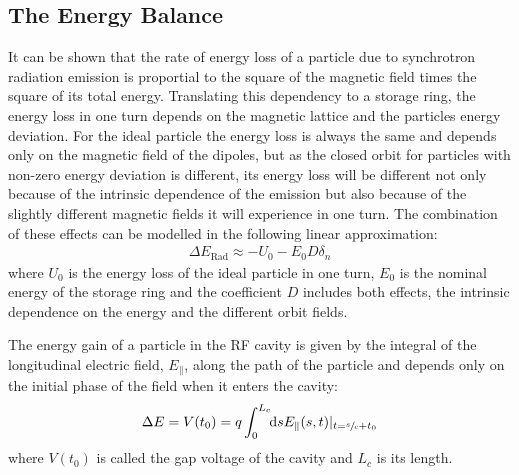 \documentclass[
	12pt,				%
	openright,			%
	oneside,			%
	a4paper,		%
	chapter=TITLE,		%
	section=TITLE,		%
    brazil,				%
	english,			%
	sumario=tradicional,
	]{abntex2}
\begin{document}
	\subsection{The Energy Balance}

	It can be shown that the rate of energy loss of a particle due to synchrotron radiation emission is proportial to the square of the magnetic field times the square of its total energy. Translating this dependency to a storage ring, the energy loss in one turn depends on the magnetic lattice and the particles energy deviation. For the ideal particle the energy loss is always the same and depends only on the magnetic field of the dipoles, but as the closed orbit for particles with non-zero energy deviation is different, its energy loss will be different not only because of the intrinsic dependence of the emission but also because of the slightly different magnetic fields it will experience in one turn. The combination of these effects can be modelled in the following linear approximation:
	\begin{align}\label{eq:radiation_loss}
		\Delta E_\text{Rad} \approx -U_0 - E_0D\delta_n
	\end{align}
	where $U_0$ is the energy loss of the ideal particle in one turn, $E_0$ is the nominal energy of the storage ring and the coefficient $D$ includes both effects, the intrinsic dependence on the energy and the different orbit fields.

	The energy gain of a particle in the RF cavity is given by the integral of the longitudinal electric field, $E_\parallel$, along the path of the particle and depends only on the initial phase of the field when it enters the cavity:
	\begin{align}
		\Delta E = V(t_0) = q\defint{s}{E_\parallel(s,t)|_{t=\sfrac{s}{c}+t_0}}{0}{L_c}
	\end{align}
	where $V(t_0)$ is called the gap voltage of the cavity and $L_c$ is its length.
\end{document}
